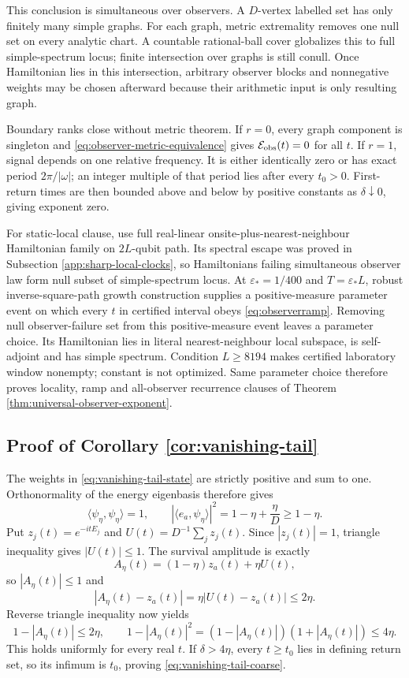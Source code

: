 This conclusion is simultaneous over observers.  A $D$-vertex labelled
set has only finitely many simple graphs.  For each graph, metric extremality
removes one null set on every analytic chart.  A countable rational-ball
cover globalizes this to full simple-spectrum locus; finite intersection over
graphs is still conull.  Once Hamiltonian lies in this intersection, arbitrary
observer blocks and nonnegative weights may be chosen afterward because
their arithmetic input is only resulting graph.

Boundary ranks close without metric theorem.  If $r=0$, every graph component
is singleton and \eqref{eq:observer-metric-equivalence} gives
$\mathcal E_{\rm obs}(t)=0$ for all $t$.  If $r=1$, signal depends on one
relative frequency.  It is either identically zero or has exact period
$2\pi/|\omega|$; an integer multiple of that period lies after every $t_0>0$.
First-return times are then bounded above and below by positive constants as
$\delta\downarrow0$, giving exponent zero.

For static-local clause, use full real-linear onsite-plus-nearest-neighbour
Hamiltonian family on $2L$-qubit path.  Its spectral escape was proved in
Subsection \ref{app:sharp-local-clocks}, so Hamiltonians failing simultaneous
observer law form null subset of simple-spectrum locus.  At
$\varepsilon_*=1/400$ and $T=\varepsilon_*L$, robust inverse-square-path
growth construction supplies a positive-measure parameter event on which
every $t$ in certified interval obeys \eqref{eq:observerramp}.  Removing null
observer-failure set from this positive-measure event leaves a parameter
choice.  Its Hamiltonian lies in literal nearest-neighbour local subspace, is
self-adjoint and has simple spectrum.  Condition $L\ge8194$ makes certified
laboratory window nonempty; constant is not optimized.  Same parameter
choice therefore proves locality, ramp and all-observer recurrence clauses
of Theorem \ref{thm:universal-observer-exponent}.

\subsection{Proof of Corollary \ref{cor:vanishing-tail}}

The weights in \eqref{eq:vanishing-tail-state} are strictly positive and sum
to one.  Orthonormality of the energy eigenbasis therefore gives
\[
 \langle\psi_\eta,\psi_\eta\rangle=1,
 \qquad
 |\langle e_a,\psi_\eta\rangle|^2
 =1-\eta+\frac{\eta}{D}\ge1-\eta.
\]
Put $z_j(t)=e^{-itE_j}$ and
$U(t)=D^{-1}\sum_jz_j(t)$.  Since $|z_j(t)|=1$, triangle inequality gives
$|U(t)|\le1$.  The survival amplitude is exactly
\[
 A_\eta(t)=(1-\eta)z_a(t)+\eta U(t),
\]
so $|A_\eta(t)|\le1$ and
\[
 |A_\eta(t)-z_a(t)|=\eta|U(t)-z_a(t)|\le2\eta.
\]
Reverse triangle inequality now yields
\[
 1-|A_\eta(t)|\le2\eta,
 \qquad
 1-|A_\eta(t)|^2
 =(1-|A_\eta(t)|)(1+|A_\eta(t)|)\le4\eta.
\]
This holds uniformly for every real $t$.  If $\delta>4\eta$, every
$t\ge t_0$ lies in defining return set, so its infimum is $t_0$, proving
\eqref{eq:vanishing-tail-coarse}.

